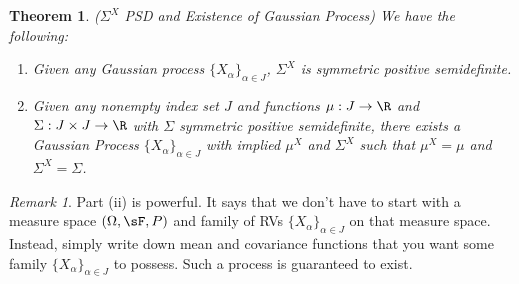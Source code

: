 \documentclass[12pt]{article}
\theoremstyle{plain}
\newtheorem{thm}{Theorem}[section]
\theoremstyle{definition}
\theoremstyle{remark}
\newtheorem*{rmk}{Remark}
\newcommand{\ra}{\rightarrow}
\begin{document}
\begin{thm}\emph{($\Sigma^X$ PSD and Existence of Gaussian Process)}
\label{thm:gaussian}
We have the following:
\begin{enumerate}[label=\emph{(\roman*)}]
  \item
    Given any Gaussian process $\{X_\alpha\}_{\alpha\in J}$,
    $\Sigma^X$ is symmetric positive semidefinite.
  \item
    Given any nonempty index set $J$ and functions $\mu:J\ra\R$ and
    $\Sigma:J\times J\ra\R$ with $\Sigma$ symmetric positive
    semidefinite, there exists a Gaussian Process
    $\{X_\alpha\}_{\alpha\in J}$ with implied $\mu^X$ and $\Sigma^X$
    such that $\mu^X=\mu$ and $\Sigma^X=\Sigma$.
\end{enumerate}
\end{thm}
\begin{rmk}
Part (ii) is powerful.
It says that we don't have to start with a measure space
$(\Omega,\sF,P)$ and family of RVs $\{X_\alpha\}_{\alpha\in J}$ on that
measure space. Instead, simply write down mean and covariance
functions that you want some family $\{X_\alpha\}_{\alpha\in J}$ to
possess. Such a process is guaranteed to exist.
\end{rmk}
\end{document}
